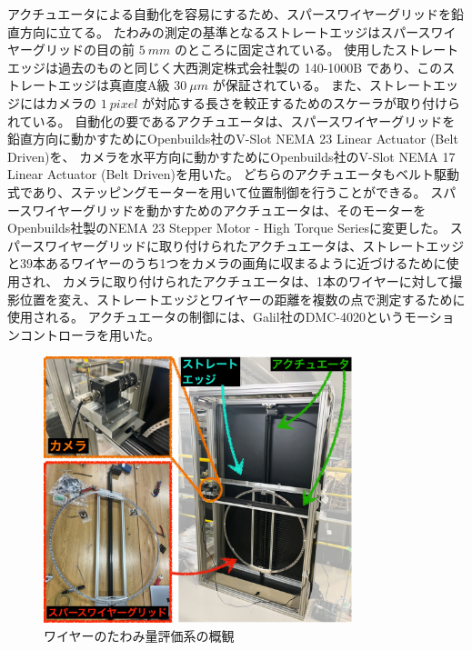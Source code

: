 \documentclass[../../main.tex]{subfiles}
\begin{document}
アクチュエータによる自動化を容易にするため、スパースワイヤーグリッドを鉛直方向に立てる。
たわみの測定の基準となるストレートエッジはスパースワイヤーグリッドの目の前 $\SI{5}{mm}$ のところに固定されている。
使用したストレートエッジは過去のものと同じく大西測定株式会社製の 140-1000B であり、このストレートエッジは真直度A級 $\SI{30}{\mu m}$ が保証されている。
また、ストレートエッジにはカメラの $\SI{1}{pixel}$ が対応する長さを較正するためのスケーラが取り付けられている。
自動化の要であるアクチュエータは、スパースワイヤーグリッドを鉛直方向に動かすためにOpenbuilds社のV-Slot NEMA 23 Linear Actuator (Belt Driven)を、
カメラを水平方向に動かすためにOpenbuilds社のV-Slot NEMA 17 Linear Actuator (Belt Driven)を用いた。
どちらのアクチュエータもベルト駆動式であり、ステッピングモーターを用いて位置制御を行うことができる。
スパースワイヤーグリッドを動かすためのアクチュエータは、そのモーターをOpenbuilds社製のNEMA 23 Stepper Motor - High Torque Seriesに変更した。
スパースワイヤーグリッドに取り付けられたアクチュエータは、ストレートエッジと39本あるワイヤーのうち1つをカメラの画角に収まるように近づけるために使用され、
カメラに取り付けられたアクチュエータは、1本のワイヤーに対して撮影位置を変え、ストレートエッジとワイヤーの距離を複数の点で測定するために使用される。
アクチュエータの制御には、Galil社のDMC-4020というモーションコントローラを用いた。
\begin{figure}[H]
    \centering
    \includegraphics[width=0.8\textwidth]{wiresag/wiresag_system.pdf}
    \caption{ワイヤーのたわみ量評価系の概観}
    \label{fig:wiresag_system}
\end{figure}
\end{document}
